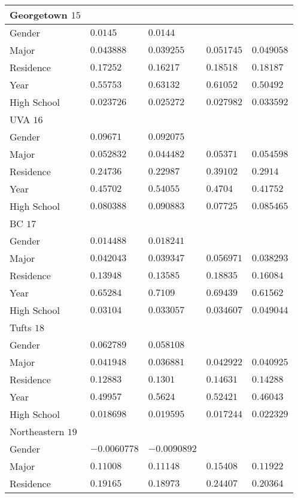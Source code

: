 \begin{center}
\begin{longtable}{|l|l|l|l|l|}
Georgetown $15$ & & &   \\ \hline
Gender & $0.0145$ & $0.0144$ & & \\
Major & $0.043888$ & $0.039255$ & $0.051745$ & $0.049058$ \\
Residence & $0.17252$ & $0.16217$ & $0.18518$ & $0.18187$ \\
Year & $0.55753$ & $0.63132$ & $0.61052$ & $0.50492$ \\
High School & $0.023726$ & $0.025272$ & $0.027982$ & $0.033592$ \\ \hline \hline
UVA $16$ & & &   \\ \hline
Gender & $0.09671$ & $0.092075$ & & \\
Major & $0.052832$ & $0.044482$ & $0.05371$ & $0.054598$ \\
Residence & $0.24736$ & $0.22987$ & $0.39102$ & $0.2914$ \\
Year & $0.45702$ & $0.54055$ & $0.4704$ & $0.41752$ \\
High School & $0.080388$ & $0.090883$ & $0.07725$ & $0.085465$ \\ \hline \hline
BC $17$ & & &   \\ \hline
Gender & $0.014488$ & $0.018241$ & & \\
Major & $0.042043$ & $0.039347$ & $0.056971$ & $0.038293$ \\
Residence & $0.13948$ & $0.13585$ & $0.18835$ & $0.16084$ \\
Year & $0.65284$ & $0.7109$ & $0.69439$ & $0.61562$ \\
High School & $0.03104$ & $0.033057$ & $0.034607$ & $0.049044$ \\ \hline \hline
Tufts $18$ & & &   \\ \hline
Gender & $0.062789$ & $0.058108$ & & \\
Major & $0.041948$ & $0.036881$ & $0.042922$ & $0.040925$ \\
Residence & $0.12883$ & $0.1301$ & $0.14631$ & $0.14288$ \\
Year & $0.49957$ & $0.5624$ & $0.52421$ & $0.46043$ \\
High School & $0.018698$ & $0.019595$ & $0.017244$ & $0.022329$ \\ \hline \hline
Northeastern $19$ & & &   \\ \hline
Gender & $-0.0060778$ & $-0.0090892$ & & \\
Major & $0.11008$ & $0.11148$ & $0.15408$ & $0.11922$ \\
Residence & $0.19165$ & $0.18973$ & $0.24407$ & $0.20364$ \\

\end{longtable}
\end{center}
